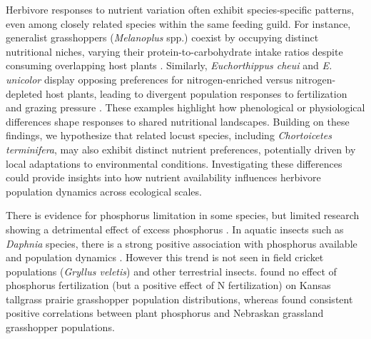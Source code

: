 \documentclass[
]{article}
\begin{document}
Herbivore responses to nutrient variation often exhibit species-specific
patterns, even among closely related species within the same feeding
guild. For instance, generalist grasshoppers (\emph{Melanoplus} spp.)
coexist by occupying distinct nutritional niches, varying their
protein-to-carbohydrate intake ratios despite consuming overlapping host
plants \citep{behmer_coexisting_2008}. Similarly, \emph{Euchorthippus
cheui} and \emph{E. unicolor} display opposing preferences for
nitrogen-enriched versus nitrogen-depleted host plants, leading to
divergent population responses to fertilization and grazing pressure
\citep{zhu_phenology_2020, zhu_constrasting_2023}. These examples
highlight how phenological or physiological differences shape responses
to shared nutritional landscapes. Building on these findings, we
hypothesize that related locust species, including \emph{Chortoicetes
terminifera}, may also exhibit distinct nutrient preferences,
potentially driven by local adaptations to environmental conditions.
Investigating these differences could provide insights into how nutrient
availability influences herbivore population dynamics across ecological
scales.

There is evidence for phosphorus limitation in some species, but limited
research showing a detrimental effect of excess phosphorus
\citep{cease_dietary_2016}. In aquatic insects such as \emph{Daphnia}
species, there is a strong positive association with phosphorus
available and population dynamics \citet{andersen_stoichiometry_2004}.
However this trend is not seen in field cricket populations
(\emph{Gryllus veletis}) \citep{harrison_synthesis_2014} and other
terrestrial insects. \citet{loaiza2011} found no effect of phosphorus
fertilization (but a positive effect of N fertilization) on Kansas
tallgrass prairie grasshopper population distributions, whereas
\citet{joern_not_2012} found consistent positive correlations between
plant phosphorus and Nebraskan grassland grasshopper populations.
\end{document}
